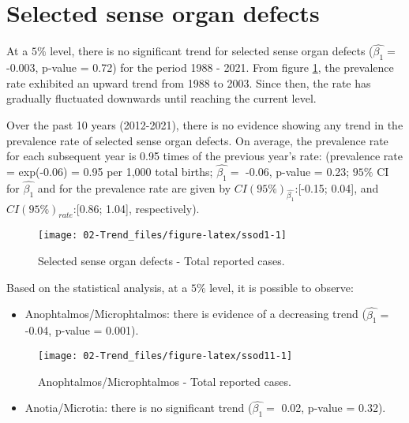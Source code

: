 \documentclass[
]{krantz}
\providecommand{\tightlist}{%
  \setlength{\itemsep}{0pt}\setlength{\parskip}{0pt}}
\begin{document}
\hypertarget{section34}{%
\section{Selected sense organ defects}\label{section34}}

At a \(5\%\) level, there is no significant trend for selected sense organ defects (\(\hat{\beta_{1}} =\) -0.003, p-value = 0.72) for the period 1988 - 2021. From figure \ref{fig:ssod1}, the prevalence rate exhibited an upward trend from 1988 to 2003. Since then, the rate has gradually fluctuated downwards until reaching the current level.

Over the past 10 years (2012-2021), there is no evidence showing any trend in the prevalence rate of selected sense organ defects. On average, the prevalence rate for each subsequent year is 0.95 times of the previous year's rate: (prevalence rate = exp(-0.06) = 0.95 per 1,000 total births; \(\hat{\beta_{1}} =\) -0.06, p-value = 0.23; \(95\%\) CI for \(\hat{\beta_{1}}\) and for the prevalence rate are given by \(CI(95\%)_{\hat{\beta_{1}}}\):{[}-0.15; 0.04{]}, and \(CI(95\%)_{rate}\):{[}0.86; 1.04{]}, respectively).

\begin{figure}[h]

{\centering \texttt{[image: 02-Trend\_files/figure-latex/ssod1-1]} 

}

\caption{Selected sense organ defects - Total reported cases.}\label{fig:ssod1}
\end{figure}

Based on the statistical analysis, at a \(5\%\) level, it is possible to observe:

\begin{itemize}
\tightlist
\item
  Anophtalmos/Microphtalmos: there is evidence of a decreasing trend (\(\hat{\beta_{1}} =\) -0.04, p-value = 0.001).
\end{itemize}

\begin{figure}[h]

{\centering \texttt{[image: 02-Trend\_files/figure-latex/ssod11-1]} 

}

\caption{Anophtalmos/Microphtalmos - Total reported cases.}\label{fig:ssod11}
\end{figure}

\begin{itemize}
\tightlist
\item
  Anotia/Microtia: there is no significant trend (\(\hat{\beta_{1}} =\) 0.02, p-value = 0.32).
\end{itemize}
\end{document}
